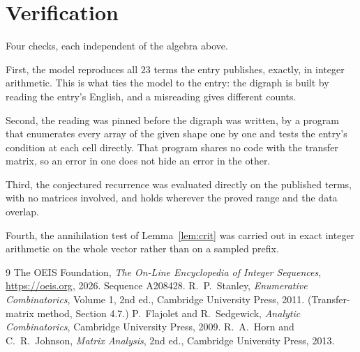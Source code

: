 \documentclass[11pt,a4paper]{article}
\theoremstyle{plain}
\theoremstyle{definition}
\begin{document}
\section{Verification}

Four checks, each independent of the algebra above.

First, the model reproduces all $23$ terms the entry publishes, exactly, in integer
arithmetic. This is what ties the model to the entry: the digraph is built by reading the
entry's English, and a misreading gives different counts.

Second, the reading was pinned before the digraph was written, by a program that enumerates
every array of the given shape one by one and tests the entry's condition at each cell
directly. That program shares no code with the transfer matrix, so an error in one does not
hide an error in the other.

Third, the conjectured recurrence was evaluated directly on the published terms, with no
matrices involved, and holds wherever the proved range and the data overlap.

Fourth, the annihilation test of Lemma~\ref{lem:crit} was carried out in exact integer
arithmetic on the whole vector rather than on a sampled prefix.

\begin{thebibliography}{9}
 The OEIS Foundation, \emph{The On-Line Encyclopedia of Integer
Sequences}, \url{https://oeis.org}, 2026. Sequence A208428.
 R.~P.~Stanley, \emph{Enumerative Combinatorics}, Volume 1, 2nd ed.,
Cambridge University Press, 2011. (Transfer-matrix method, Section 4.7.)
 P.~Flajolet and R.~Sedgewick, \emph{Analytic Combinatorics}, Cambridge
University Press, 2009.
 R.~A.~Horn and C.~R.~Johnson, \emph{Matrix Analysis}, 2nd ed., Cambridge
University Press, 2013.
\end{thebibliography}
\end{document}
